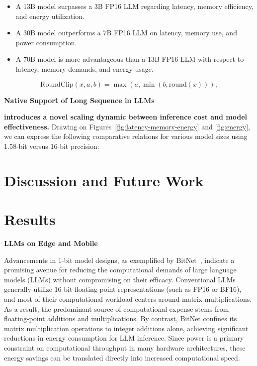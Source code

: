 \begin{itemize}
    \item A 13B  model surpasses a 3B FP16 LLM regarding latency, memory efficiency, and energy utilization.
    \item A 30B  model outperforms a 7B FP16 LLM on latency, memory use, and power consumption.
    \item A 70B  model is more advantageous than a 13B FP16 LLM with respect to latency, memory demands, and energy usage.
\end{itemize}

\begin{equation}
    \mathrm{RoundClip}(x, a, b) = \max(a, \min(b, \mathrm{round}(x))),
\end{equation}

\textbf{Native Support of Long Sequence in LLMs}

\textbf{ introduces a novel scaling dynamic between inference cost and model effectiveness.} Drawing on Figures~\ref{fig:latency-memory-energy} and \ref{fig:energy}, we can express the following comparative relations for various model sizes using 1.58-bit versus 16-bit precision:

\section{Discussion and Future Work}

\section{Results}

\textbf{LLMs on Edge and Mobile}

Advancements in 1-bit model designs, as exemplified by BitNet~\cite{bitnet}, indicate a promising avenue for reducing the computational demands of large language models (LLMs) without compromising on their efficacy. Conventional LLMs generally utilize 16-bit floating-point representations (such as FP16 or BF16), and most of their computational workload centers around matrix multiplications. As a result, the predominant source of computational expense stems from floating-point additions and multiplications. By contrast, BitNet confines its matrix multiplication operations to integer additions alone, achieving significant reductions in energy consumption for LLM inference. Since power is a primary constraint on computational throughput in many hardware architectures, these energy savings can be translated directly into increased computational speed.

